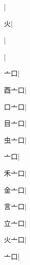 \begin{multicols}{2}
{{\cjk{}{\cnsym{}　}{\cnsym{}　}{\cnsym{}　}}|{}\par
{\cjk{}{\cnsym{}　}{\cnsym{}　}火}|{}\par
{\cjk{}{\cnsym{}　}{\cnsym{}　}{\cnsym{}　}}|{}\par
{\cjk{}{\cnsym{}　}{\cnsym{}　}{\cnsym{}　}}|{}\par
{\cjk{}{\cnsym{}　}亠口}|{}\par
{\cjk{}酉亠口}|{}\par
{\cjk{}口亠口}|{}\par
{\cjk{}目亠口}|{}\par
{\cjk{}虫亠口}|{}\par
{亠口}|{}\par
{\cjk{}禾亠口}|{}\par
{\cjk{}金亠口}|{}\par
{\cjk{}言亠口}|{}\par
{\cjk{}立亠口}|{}\par
{\cjk{}火亠口}|{}\par
{亠口}|{}\par
}
\end{multicols}

